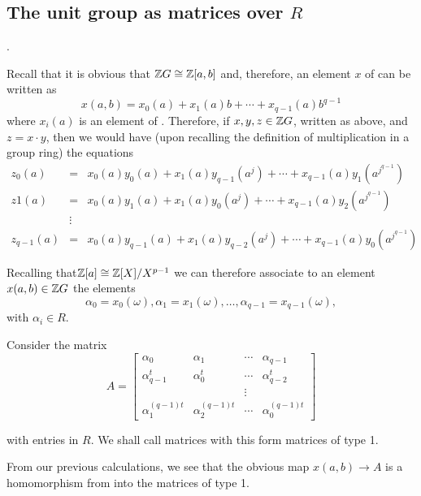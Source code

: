 \documentclass[11pt]{report}
\begin{document}
\subsection{The unit group as matrices over $R$}.

        Recall that it is obvious that $ \mathbb{Z}G\cong \mathbb{Z}[a,b]$ and, therefore, 
an element $x$ of \intG{} can
be written as\[x(a,b) = x_0(a) + x_1(a)b + \cdots + x_{q-1}(a)b^{q-1}\]
where $x_i(a)$ is an element of \inta. Therefore, if $x,y,z \in  \mathbb{Z}G$, 
written as above, and $z=x\cdot y$, then we would have (upon recalling the definition of 
multiplication in a group ring)
the equations
\begin{align*}
z_0(a) &=& x_0(a)y_0(a) + x_1(a)y_{q-1}(a^j) +\cdots+ x_{q-1}(a)y_1(a^{j^{q-1}})\\
z1(a) &=& x_0(a)y_1 (a) + x_1(a)y_0(a^j) +\cdots + x_{q-1}(a)y_2(a^{j^{q-1}})\\
&\vdots&\\
z_{q-1} (a) &=& x_0(a)y_{q-1}(a) + x_1(a)y_{q-2}(a^j) + \cdots + x_{q-1}(a)y_0(a^{j^{q-1}})
\end{align*}

 Recalling that$ \mathbb{Z}[a] \cong  \mathbb{Z}[X]/X^{p-1}$ we can therefore associate 
to an
element $x(a,b) \in \mathbb{Z}G$ the 
elements\[\alpha_0 = x_0(\omega), \alpha_1 = x_1(\omega),\ldots,
 \alpha_{q-1} = x_{q-1}(\omega),\]
with $\alpha_i \in R$.


        Consider the matrix
\[
A = 
\begin{bmatrix}
\alpha_0 &\alpha_1 &\cdots&\alpha_{q-1}\\
\alpha_{q-1}^t &\alpha_0^t &\cdots&\alpha_{q-2}^t\\
&&\vdots& \\
 \alpha_1^{(q-1)t} &\alpha_2^{(q-1)t} &\cdots&\alpha_0^{(q-1)t}
\end{bmatrix}
\]

with entries in $R$. We shall call matrices with this form matrices 
of type 1.


        From our previous calculations, we see that the obvious map 
$x(a,b)\to A$ is a
homomorphism from \intG{} into the matrices of type 1.
\end{document}
